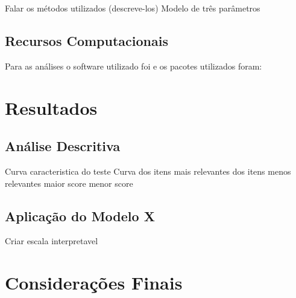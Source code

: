 \documentclass[]{article}
\begin{document}
Falar os métodos utilizados (descreve-los) Modelo de três parâmetros

\subsection{Recursos Computacionais}\label{recursos-computacionais}

Para as análises o software utilizado foi \citet{software-r} e os
pacotes utilizados foram:

\section{Resultados}\label{resultados}

\subsection{Análise Descritiva}\label{analise-descritiva}

Curva caracteristica do teste Curva dos itens mais relevantes dos itens
menos relevantes maior score menor score

\subsection{Aplicação do Modelo X}\label{aplicacao-do-modelo-x}

Criar escala interpretavel

\section{Considerações Finais}\label{consideracoes-finais}


\end{document}
